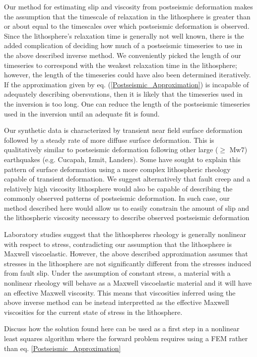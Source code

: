 \documentclass[12pt]{article}
\begin{document}
Our method for estimating slip and viscosity from postseismic
deformation makes the assumption that the timescale of relaxation in
the lithosphere is greater than or about equal to the timescales over
which postseismic deformation is observed.  Since the lithosphere's
relaxation time is generally not well known, there is the added
complication of deciding how much of a postseismic timeseries to use
in the above described inverse method.  We conveniently picked the
length of our timeseries to correspond with the weakest relaxation
time in the lithosphere; however, the length of the timeseries could
have also been determined iteratively.  If the approximation given by
eq. (\ref{Postseismic_Approximation}) is incapable of adequately
describing obersvations, then it is likely that the timeseries used in
the inversion is too long.  One can reduce the length of the
postseismic timeseries used in the inversion until an adequate fit is
found.

Our synthetic data is characterized by transient near field surface
deformation followed by a steady rate of more diffuse surface
deformation.  This is qualitatively similar to postseismic
deformation following other large ($\geq$ Mw7) earthquakes
(e.g. Cucapah, Izmit, Landers).  Some have sought to explain this
pattern of surface deformation using a more complex lithospheric
rheology capable of transient deformation. We suggest
alternatively that fault creep and a relatively high viscosity
lithosphere would also be capable of describing the commonly observed
patterns of postseismic deformation.  In such case, our method
described here would allow us to easily constrain the amount of slip
and the lithospheric viscosity necessary to describe observed
postseismic deformation

Laboratory studies suggest that the lithospheres rheology is generally
nonlinear with respect to stress, contradicting our assumption that
the lithosphere is Maxwell viscoelastic.  However, the above described
approximation assumes that stresses in the lithosphere are not
significantly different from the stresses induced from fault slip.
Under the assumption of constant stress, a material with a nonlinear
rheology will behave as a Maxwell viscoelastic material and it will
have an effective Maxwell viscosity.  This means that viscosities
inferred using the above inverse method can be instead interpretted as
the effective Maxwell viscosities for the current state of stress in
the lithosphere.

Discuss how the solution found here can be used as a first step in a
nonlinear least squares algorithm where the forward problem requires
using a FEM rather than eq. \ref{Postseismic_Approximation}
\end{document}
